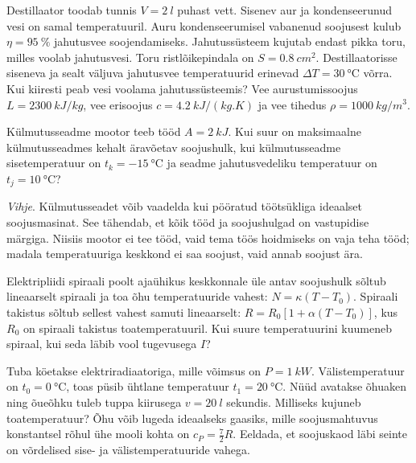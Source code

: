 \documentclass[10pt, twoside]{article}
\begin{document}
{
Destillaator toodab tunnis $V=\SI{2}{l}$ puhast vett. Sisenev aur ja kondenseerunud vesi on samal temperatuuril. Auru kondenseerumisel vabanenud soojusest kulub $\eta=\SI{95}{\%}$ jahutusvee soojendamiseks. Jahutussüsteem kujutab endast pikka toru, milles voolab jahutusvesi. Toru ristlõikepindala on $S=\SI{0,8}{cm^2}$. Destillaatorisse siseneva ja sealt väljuva jahutusvee temperatuurid erinevad $\Delta T=\SI{30}{\degreeCelsius}$ võrra. Kui kiiresti peab vesi voolama jahutussüsteemis? Vee aurustumissoojus $L=\SI{2300}{kJ/kg}$, vee erisoojus $c = \SI{4,2}{kJ/(kg.K)}$ ja vee tihedus $\rho=\SI{1000}{kg/m^3}$.
\probend
\bigskip


Külmutusseadme mootor teeb tööd $A = \SI{2}{kJ}$. Kui suur on maksimaalne külmutusseadmes kehalt äravõetav soojushulk, kui külmutusseadme sisetemperatuur on $t_k = \SI{-15}{\degreeCelsius}$ ja seadme jahutusvedeliku temperatuur on $t_j = \SI{10}{\degreeCelsius}$?

\emph{Vihje}.
Külmutusseadet võib vaadelda kui pööratud töötsükliga ideaalset soojusmasinat. See tähendab, et kõik tööd ja soojushulgad on vastupidise märgiga.
Niisiis mootor ei tee tööd, vaid tema töös hoidmiseks on vaja teha tööd; madala
temperatuuriga keskkond ei saa soojust, vaid annab soojust ära.
\probend
\bigskip


Elektripliidi spiraali poolt ajaühikus keskkonnale üle antav soojushulk sõltub lineaarselt spiraali ja toa õhu temperatuuride vahest: $N = \kappa (T - T_0)$. Spiraali takistus sõltub sellest vahest samuti lineaarselt: $R = R_0 [1+\alpha (T -T_0)]$, kus $R_0$ on spiraali takistus toatemperatuuril. Kui suure temperatuurini kuumeneb spiraal, kui seda läbib vool tugevusega $I$?
\probend
\bigskip


Tuba köetakse elektriradiaatoriga, mille võimsus on $P=\SI{1}{kW}$. Välistemperatuur on $t_0=\SI{0}{\degreeCelsius}$, toas püsib ühtlane temperatuur $t_1=\SI{20}{\degreeCelsius}$.
Nüüd avatakse õhuaken ning õueõhku tuleb tuppa kiirusega $v=\SI{20}{l}$ sekundis. Milliseks kujuneb toatemperatuur? Õhu võib lugeda ideaalseks gaasiks,
mille soojusmahtuvus konstantsel rõhul ühe mooli kohta on $c_P=\frac 72R$. Eeldada, et soojuskaod läbi seinte on võrdelised sise- ja välistemperatuuride vahega.
\probend
\bigskip

}
\end{document}

